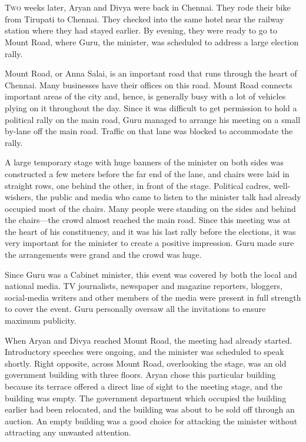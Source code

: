 \chapter{}

\lettrine{T}{wo} weeks later, Aryan and Divya were back in Chennai. They rode
their bike from Tirupati to Chennai. They checked into the same hotel near the
railway station where they had stayed earlier. By evening, they were ready to go
to Mount Road, where Guru, the minister, was scheduled to address a large
election rally.

Mount Road, or Anna Salai, is an important road that runs through the heart of
Chennai. Many businesses have their offices on this road. Mount Road connects
important areas of the city and, hence, is generally busy with a lot of vehicles
plying on it throughout the day. Since it was difficult to get permission
to hold a political rally on the main road, Guru managed to arrange his meeting
on a small by-lane off the main road. Traffic on that lane was blocked to
accommodate the rally.

A large temporary stage with huge banners of the minister on both sides was
constructed a few meters before the far end of the lane, and chairs were laid in
straight rows, one behind the other, in front of the stage. Political cadres,
well-wishers, the public and media who came to listen to the minister talk had
already occupied most of the chairs. Many people were standing on the sides and
behind the chairs—the crowd almost reached the main road. Since this meeting was
at the heart of his constituency, and it was his last rally before the
elections, it was very important for the minister to create a positive
impression. Guru made sure the arrangements were grand and the crowd was huge.

Since Guru was a Cabinet minister, this event was covered by both the local and
national media. TV journalists, newspaper and magazine reporters, bloggers,
social-media writers and other members of the media were present in full
strength to cover the event. Guru personally oversaw all the invitations to
ensure maximum publicity.

When Aryan and Divya reached Mount Road, the meeting had already started.
Introductory speeches were ongoing, and the minister was scheduled to speak shortly.
Right opposite, across Mount Road, overlooking the stage, was an old government
building with three floors. Aryan chose this particular building because its
terrace offered a direct line of sight to the meeting stage, and the building was
empty. The government department which occupied the building earlier had been
relocated, and the building was about to be sold off through an auction. An empty
building was a good choice for attacking the minister without attracting any
unwanted attention.

